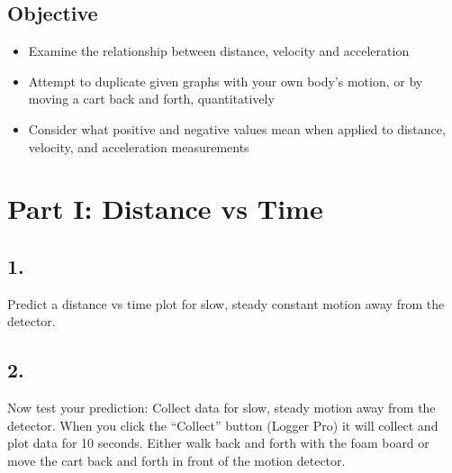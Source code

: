     \subsection*{Objective}

    \begin{itemize}
        \item Examine the relationship between distance, velocity and acceleration
        \item Attempt to duplicate given graphs with your own body's motion, or by moving a cart back and forth, quantitatively
        \item Consider what positive and negative values mean when applied to distance, velocity, and acceleration measurements
        
    \end{itemize}

    \section*{Part I: Distance vs Time}

    \subsection*{1.}
    Predict a distance vs time plot for slow, steady constant motion away from the detector.

    \begin{mdframed}
        \centering{}
    \end{mdframed}

    \subsection*{2.}
    Now test your prediction: Collect data for slow, steady motion away from the detector. When you click the “Collect” button (Logger Pro) it will collect and plot data for 10 seconds. Either walk back and forth with the foam board or move the cart back and forth in front of the motion detector.

